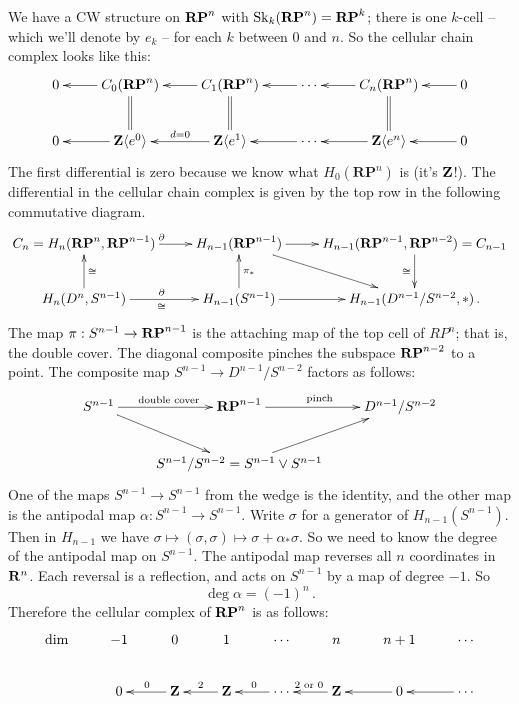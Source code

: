 We have a CW structure on $\mathbf{RP}^n$ with $\mathrm{Sk}_k(\mathbf{RP}^n)=\mathbf{RP}^k$;
there is one $k$-cell -- which we'll denote by $e_k$ -- for each $k$ between $0$ and $n$. So the cellular chain complex looks like this:
\begin{equation*}
\xymatrix{0  & C_0(\mathbf{RP}^n)\ar@{=}[d]\ar[l] & C_1(\mathbf{RP}^n)\ar@{=}[d]\ar[l] & \cdots\ar[l] & C_n(\mathbf{RP}^n)\ar@{=}[d]\ar[l] & 0 \ar[l]\\
0 & \Z\langle e^0\rangle \ar[l] & \Z\langle e^1\rangle\ar[l]_{d=0} & \cdots\ar[l] & \Z\langle e^n\rangle\ar[l] & 0 \ar[l] }
\end{equation*}
The first differential is zero because we know what $ H_0(\mathbf{RP}^n)$ is (it's $\mathbf Z$!). The differential in the cellular chain complex is given by the top
row in the following commutative diagram.
\begin{equation*}
\xymatrix{C_n= H_n(\mathbf{RP}^n,\mathbf{RP}^{n-1})\ar[r]^\partial & 
H_{n-1}(\mathbf{RP}^{n-1}) \ar[r] \ar[dr] & 
H_{n-1}(\mathbf{RP}^{n-1},\mathbf{RP}^{n-2})=C_{n-1} \ar[d]_{\cong} \\
H_n(D^n,S^{n-1}) \ar[u]_\cong \ar[r]^\partial_\cong & 
H_{n-1}(S^{n-1}) \ar[u]_{\pi_*} \ar[r] & H_{n-1}(D^{n-1}/S^{n-2},\ast)\,.
}
\end{equation*}
The map $\pi:S^{n-1}\to\mathbf{RP}^{n-1}$ is the attaching map of the top cell of $RP^n$; that is, the double cover. The diagonal composite pinches the subspace 
$\mathbf{RP}^{n-2}$ to a point. The composite map $S^{n-1}\to D^{n-1}/S^{n-2}$ 
factors as follows: 
\begin{equation*}
\xymatrix{S^{n-1}\ar[r]^{\text{double cover}}\ar[dr] & \mathbf{RP}^{n-1}\ar[r]^{\text{pinch}} & D^{n-1}/S^{n-2}\\
 & S^{n-1}/S^{n-2}=S^{n-1}\vee S^{n-1}\ar[ur]}
\end{equation*}
One of the maps $S^{n-1}\to S^{n-1}$ from the wedge is the identity, and the other map is the antipodal map $\alpha:S^{n-1}\to S^{n-1}$. Write $\sigma$ for a generator of $ H_{n-1}(S^{n-1})$. Then in $H_{n-1}$ we have $\sigma\mapsto (\sigma,\sigma)\mapsto \sigma+\alpha_\ast\sigma$. So we need to know the degree of the antipodal map on $S^{n-1}$. The antipodal map reverses all $n$ coordinates in $\mathbf R^n$. Each reversal is a reflection, and acts on $S^{n-1}$ by a map of degree $-1$. So 
\[
\deg\alpha=(-1)^n\,.
\]
Therefore the cellular complex of $\mathbf{RP}^n$ is as follows: 
\begin{equation*}
\xymatrix{\hbox{dim} & -1 & 0 & 1 & \cdots & n & n+1 & \cdots \\
& 0 & \Z\ar[l]_0 & \Z\ar[l]_2 & \cdots\ar[l]_0 & \Z\ar[l]_{2\text{ or }0} & 0\ar[l] & \cdots\ar[l]}
\end{equation*}
